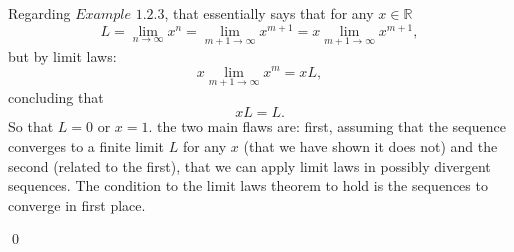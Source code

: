 \documentclass{article}
\theoremstyle{remark}
\begin{document}
\begin{enumerate}
        Regarding $Example$ $1.2.3$, that essentially says that for any $x \in \mathbb{R}$
        \[
        L = \lim_{n\to\infty}x^n = \lim_{m+1\to\infty}x^{m+1} = x\lim_{m+1\to\infty}x^{m+1},
        \]
        but by limit laws:
        \[
        x\lim_{m+1\to\infty}x^{m} = xL,
        \]
        concluding that 
        \[
        xL = L.
        \]
        So that $L = 0$ or $x = 1$.
        the two main flaws are: 
        first, assuming that the sequence converges to a finite limit $L$ for any $x$ (that we have shown it does not)
        and the second (related to the first), that we can apply limit laws in possibly divergent sequences. The condition
        to the limit laws theorem to hold is the sequences to converge in first place.
        \begin{flushright}
            \qed
        \end{flushright}


\end{enumerate}
\end{document}
